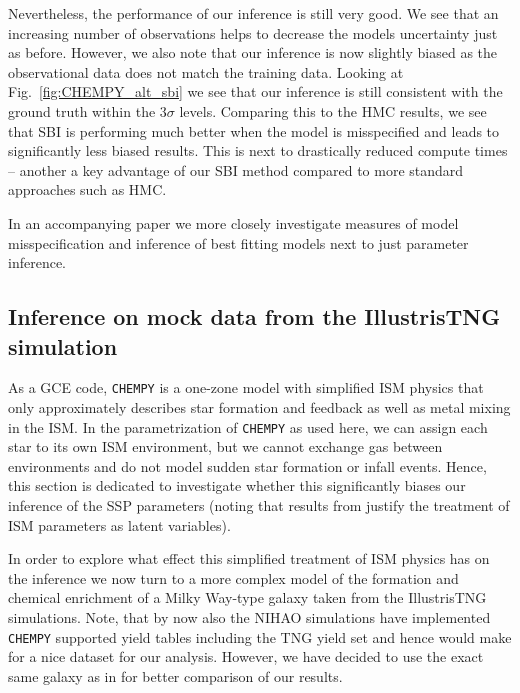 \documentclass{aa}
\begin{document}
Nevertheless, the performance of our inference is still very good. We see that an increasing number of observations helps to decrease the models uncertainty just as before. However, we also note that our inference is now slightly biased as the observational data does not match the training data. Looking at Fig.~\ref{fig:CHEMPY_alt_sbi} we see that our inference is still consistent with the ground truth within the $3\sigma$ levels. Comparing this to the HMC results, we see that SBI is performing much better when the model is misspecified and leads to significantly less biased results. This is next to drastically reduced compute times -- another a key advantage of our SBI method compared to more standard approaches such as HMC.

In an accompanying paper we more closely investigate measures of model misspecification and inference of best fitting models next to just parameter inference.  

\subsection{Inference on mock data from the IllustrisTNG simulation}
\label{subsec:tng_sim}

As a GCE code, \texttt{CHEMPY} is a one-zone model with simplified ISM physics that only approximately describes star formation and feedback as well as metal mixing in the ISM.
In the parametrization of \texttt{CHEMPY} as used here, we can assign each star to its own ISM environment, but we cannot exchange gas between environments and do not model sudden star formation or infall events. Hence, this section is dedicated to investigate whether this significantly biases our inference of the SSP parameters (noting that results from \citet{2019ApJ...874..102W} justify the treatment of ISM parameters as latent variables).

In order to explore what effect this simplified treatment of ISM physics has on the inference we now turn to a more complex model of the formation and chemical enrichment of a Milky Way-type galaxy taken from the IllustrisTNG simulations. Note, that by now also the NIHAO simulations \citep{Wang2015, Buck2020,Buck2020c} have implemented \texttt{CHEMPY} supported yield tables including the TNG yield set \citep{Buck2021} and hence would make for a nice dataset for our analysis. However, we have decided to use the exact same galaxy as in \citet{Philcox_2019} for better comparison of our results.
\end{document}

